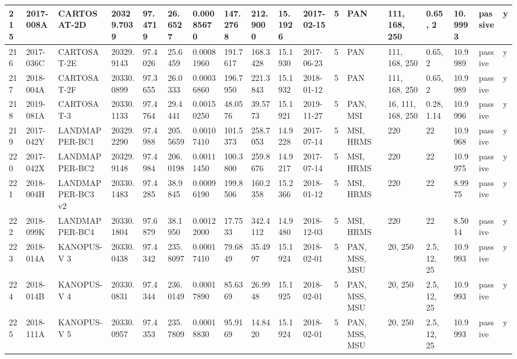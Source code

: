 \documentclass[12pt,a4paper,notitlepage,twoside,openright]{report}
\begin{document}
\begin{longtable}{|l|l|l|l|l|l|l|l|l|l|l|l|l|l|l|l|l|l|}
        215 & 2017-008A & CARTOSAT-2D & 20329.7039 & 97.4719 & 26.6527 & 0.00085670 & 147.2768 & 212.9000 & 15.1926 & 2017-02-15 & 5 & PAN & 111, 168, 250 & 0.65, 2 & 10.9993 & passive & y \\ \hline
        216 & 2017-036C & CARTOSAT-2E & 20329.9143 & 97.4026 & 25.6459 & 0.00081960 & 191.7617 & 168.3428 & 15.1930 & 2017-06-23 & 5 & PAN & 111, 168, 250 & 0.65, 2 & 10.9989 & passive & y \\ \hline
        217 & 2018-004A & CARTOSAT-2F & 20330.0899 & 97.3655 & 26.0333 & 0.00036860 & 196.7950 & 221.3843 & 15.1932 & 2018-01-12 & 5 & PAN & 111, 168, 250 & 0.65, 2 & 10.9989 & passive & y \\ \hline
        218 & 2019-081A & CARTOSAT-3 & 20330.1133 & 97.4764 & 29.4441 & 0.00150250 & 48.0576 & 39.5773 & 15.1921 & 2019-11-27 & 5 & PAN, MSI & 16, 111, 168, 250 & 0.28, 1.14 & 10.9996 & passive & y \\ \hline
        219 & 2017-042Y & LANDMAPPER-BC1 & 20329.2290 & 97.4988 & 205.5659 & 0.00107410 & 101.5373 & 258.7053 & 14.9228 & 2017-07-14 & 5 & MSI, HRMS & 220 & 22 & 10.9968 & passive & y \\ \hline
        220 & 2017-042X & LANDMAPPER-BC2 & 20329.9148 & 97.4984 & 206.0198 & 0.00111450 & 100.3800 & 259.8676 & 14.9217 & 2017-07-14 & 5 & MSI, HRMS & 220 & 22 & 10.9975 & passive & y \\ \hline
        221 & 2018-004H & LANDMAPPER-BC3 v2 & 20330.1483 & 97.4285 & 38.9845 & 0.00096190 & 199.8506 & 160.2358 & 15.2366 & 2018-01-12 & 5 & MSI, HRMS & 220 & 22 & 8.9975 & passive & y \\ \hline
        222 & 2018-099K & LANDMAPPER-BC4 & 20330.1804 & 97.6879 & 38.1950 & 0.00122000 & 17.7533 & 342.4112 & 14.9480 & 2018-12-03 & 5 & MSI, HRMS & 220 & 22 & 8.5014 & passive & y \\ \hline
        223 & 2018-014A & KANOPUS-V 3 & 20330.0438 & 97.4342 & 235.8097 & 0.00017410 & 79.6849 & 35.4997 & 15.1924 & 2018-02-01 & 5 & PAN, MSS, MSU & 20, 250 & 2.5, 12, 25 & 10.9993 & passive & y \\ \hline
        224 & 2018-014B & KANOPUS-V 4 & 20330.0831 & 97.4344 & 236.0149 & 0.00017890 & 85.6369 & 26.9948 & 15.1925 & 2018-02-01 & 5 & PAN, MSS, MSU & 20, 250 & 2.5, 12, 25 & 10.9993 & passive & y \\ \hline
        225 & 2018-111A & KANOPUS-V 5 & 20330.0957 & 97.4353 & 235.7809 & 0.00018830 & 95.9169 & 14.8420 & 15.1924 & 2018-02-01 & 5 & PAN, MSS, MSU & 20, 250 & 2.5, 12, 25 & 10.9993 & passive & y \\ \hline

\end{longtable}
\end{document}
